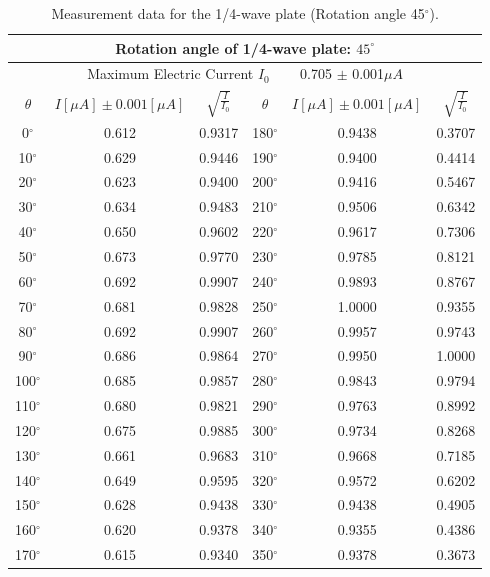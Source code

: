 \documentclass[a4paper,12pt]{article}
\begin{document}
\begin{table}[h]
\begin{center}
\begin{tabular}{|c|c|c||c|c|c|}
\hline
\multicolumn{6}{|c|}{Rotation angle of 1/4-wave plate: $45^{\circ}$}\\
\hline 
\multicolumn{6}{|c|}{Maximum Electric Current $I_0$ ~~~ 0.705 $\pm$ 0.001$\mu A$}\\
\hline 
$\theta$ & $I [\mu A] \pm 0.001 [\mu A]$ & $\sqrt{\frac{I}{I_0}}$ & $\theta$ & $I [\mu A] \pm 0.001 [\mu A]$ & $\sqrt{\frac{I}{I_0}}$ \\
\hline
0$^{\circ}$ & 0.612 & 0.9317 & 180$^{\circ}$ & 0.9438 & 0.3707 \\
\hline 
10$^{\circ}$ & 0.629 & 0.9446 & 190$^{\circ}$ & 0.9400 & 0.4414\\
\hline
20$^{\circ}$ & 0.623 & 0.9400 & 200$^{\circ}$ & 0.9416 & 0.5467\\
\hline
30$^{\circ}$ & 0.634 & 0.9483 & 210$^{\circ}$ & 0.9506 & 0.6342\\
\hline
40$^{\circ}$ & 0.650 & 0.9602 & 220$^{\circ}$ & 0.9617 & 0.7306\\
\hline
50$^{\circ}$ & 0.673 & 0.9770 & 230$^{\circ}$ & 0.9785 & 0.8121\\
\hline
60$^{\circ}$ & 0.692 & 0.9907 & 240$^{\circ}$ & 0.9893 & 0.8767\\
\hline
70$^{\circ}$ & 0.681 & 0.9828 & 250$^{\circ}$ & 1.0000 & 0.9355\\
\hline
80$^{\circ}$ & 0.692 & 0.9907 & 260$^{\circ}$ & 0.9957 & 0.9743\\
\hline
90$^{\circ}$ & 0.686 & 0.9864 & 270$^{\circ}$ & 0.9950 & 1.0000\\
\hline
100$^{\circ}$ & 0.685 & 0.9857 & 280$^{\circ}$ & 0.9843 & 0.9794\\
\hline
110$^{\circ}$ & 0.680 & 0.9821 & 290$^{\circ}$ & 0.9763 & 0.8992\\
\hline
120$^{\circ}$ & 0.675 & 0.9885 & 300$^{\circ}$ & 0.9734 & 0.8268\\
\hline
130$^{\circ}$ & 0.661 & 0.9683 & 310$^{\circ}$ & 0.9668 & 0.7185\\
\hline
140$^{\circ}$ & 0.649 & 0.9595 & 320$^{\circ}$ & 0.9572 & 0.6202\\
\hline
150$^{\circ}$ & 0.628 & 0.9438 & 330$^{\circ}$ & 0.9438 & 0.4905\\
\hline
160$^{\circ}$ & 0.620 & 0.9378 & 340$^{\circ}$ & 0.9355 & 0.4386\\
\hline
170$^{\circ}$ & 0.615 & 0.9340 & 350$^{\circ}$ & 0.9378 & 0.3673\\
\hline
\end{tabular}
\caption{Measurement data for the 1/4-wave plate (Rotation angle 45$^{\circ}$).}
\end{center}
\end{table}
\end{document}
